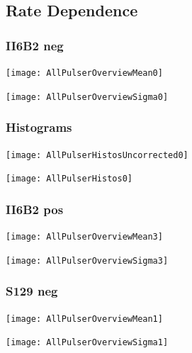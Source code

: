 \documentclass[9pt]{beamer}
\begin{document}
\subsection{Rate Dependence}
\begin{frame}
	\frametitle{II6B2 neg}
	\begin{center}
		\texttt{[image: AllPulserOverviewMean0]}
	\end{center}
\end{frame}
\begin{frame}
	\begin{center}
		\texttt{[image: AllPulserOverviewSigma0]}
	\end{center}
\end{frame}
\begin{frame}
	\frametitle{Histograms}
	\begin{center}
		\begin{minipage}{5.5cm}
			\centering
			\texttt{[image: AllPulserHistosUncorrected0]}\\
		\end{minipage}
		\begin{minipage}{5.5cm}
			\centering
			\texttt{[image: AllPulserHistos0]}\\
		\end{minipage}
	\end{center}
\end{frame}
\begin{frame}
	\frametitle{II6B2 pos}
	\begin{center}
		\texttt{[image: AllPulserOverviewMean3]}
	\end{center}
\end{frame}
\begin{frame}
	\begin{center}
		\texttt{[image: AllPulserOverviewSigma3]}
	\end{center}
\end{frame}
\begin{frame}
	\frametitle{S129 neg}
	\begin{center}
		\texttt{[image: AllPulserOverviewMean1]}
	\end{center}
\end{frame}
\begin{frame}
	\begin{center}
		\texttt{[image: AllPulserOverviewSigma1]}
	\end{center}
\end{frame}
\end{document}
